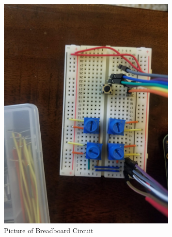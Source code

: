 \documentclass[12pt, letter]{article}
\begin{document}
\begin{figure}[h]
	\centering
	\includegraphics[width=0.8\textwidth]{../p2_circuit.jpg}
	\caption{Picture of Breadboard Circuit}
	\label{fig:-p2_circuit-jpg}
\end{figure}
\end{document}

